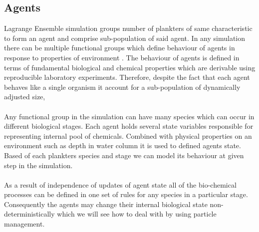 \documentclass[12pt, a4paper]{report}
\begin{document}
\subsection{Agents}\label{sec:agents}
Lagrange Ensemble simulation groups number of plankters of same characteristic
to form an agent and comprise sub-population of said agent. In any simulation
there can be multiple functional groups which define behaviour of agents in response
to properties of environment \cite{IndvPlanktonEcosystems}. The behaviour
of agents is defined in terms of fundamental biological and chemical properties
which are derivable using reproducible laboratory experiments. Therefore, despite the
fact that each agent behaves like a single organism it account for a sub-population
of dynamically adjusted size,
\\\\
Any functional group in the simulation can have many species which can occur
in different biological stages. Each agent holds several state variables responsible
for representing internal pool of chemicals. Combined with physical properties on an
environment such as depth in water column it is used to defined agents state. Based
of each plankters species and stage we can model its behaviour at given step in the simulation.
\\\\
As a result of independence of updates of agent state all of the bio-chemical processes
can be defined in one set of rules for any species in a particular stage. Consequently
the agents may change their internal biological state non-deterministically which we will see
how to deal with by using particle management.
\end{document}
